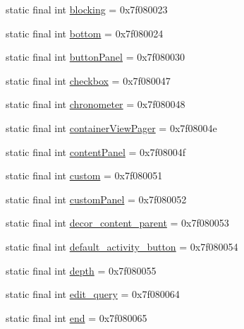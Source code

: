 \begin{DoxyCompactItemize}
static final int \mbox{\hyperlink{classcom_1_1synnapps_1_1carouselview_1_1_r_1_1id_aafcba51137f6801a670d033138ea79bc}{blocking}} = 0x7f080023
\item 
static final int \mbox{\hyperlink{classcom_1_1synnapps_1_1carouselview_1_1_r_1_1id_ade195cb43297c660f4605ecacfd8093a}{bottom}} = 0x7f080024
\item 
static final int \mbox{\hyperlink{classcom_1_1synnapps_1_1carouselview_1_1_r_1_1id_af4950f87776c468460507aab45d9c0c6}{button\+Panel}} = 0x7f080030
\item 
static final int \mbox{\hyperlink{classcom_1_1synnapps_1_1carouselview_1_1_r_1_1id_a3d79a51879e7bcf8c7d735561028c9a3}{checkbox}} = 0x7f080047
\item 
static final int \mbox{\hyperlink{classcom_1_1synnapps_1_1carouselview_1_1_r_1_1id_a3e39f0858d0786baa715662366dd7603}{chronometer}} = 0x7f080048
\item 
static final int \mbox{\hyperlink{classcom_1_1synnapps_1_1carouselview_1_1_r_1_1id_a8a6f1ccee207b944b72dd2493f7a5511}{container\+View\+Pager}} = 0x7f08004e
\item 
static final int \mbox{\hyperlink{classcom_1_1synnapps_1_1carouselview_1_1_r_1_1id_a4e288de3357b62e8b6f8f0326c8ec887}{content\+Panel}} = 0x7f08004f
\item 
static final int \mbox{\hyperlink{classcom_1_1synnapps_1_1carouselview_1_1_r_1_1id_ae318ca05c36b61f80bcb72d130ff644d}{custom}} = 0x7f080051
\item 
static final int \mbox{\hyperlink{classcom_1_1synnapps_1_1carouselview_1_1_r_1_1id_ad071dc506c952f537a8da8155f1601ae}{custom\+Panel}} = 0x7f080052
\item 
static final int \mbox{\hyperlink{classcom_1_1synnapps_1_1carouselview_1_1_r_1_1id_ab5462acd04a2b406cde23f7d31b90077}{decor\+\_\+content\+\_\+parent}} = 0x7f080053
\item 
static final int \mbox{\hyperlink{classcom_1_1synnapps_1_1carouselview_1_1_r_1_1id_a4d6edeee30ec885e12e630932323eebd}{default\+\_\+activity\+\_\+button}} = 0x7f080054
\item 
static final int \mbox{\hyperlink{classcom_1_1synnapps_1_1carouselview_1_1_r_1_1id_a0c43a82e175b4620aaffbd63fcf7c2ea}{depth}} = 0x7f080055
\item 
static final int \mbox{\hyperlink{classcom_1_1synnapps_1_1carouselview_1_1_r_1_1id_aeaed825460b674fed20867dbb8eeb7d7}{edit\+\_\+query}} = 0x7f080064
\item 
static final int \mbox{\hyperlink{classcom_1_1synnapps_1_1carouselview_1_1_r_1_1id_a83644c403d3cb9f245850a3ff236c46b}{end}} = 0x7f080065

\end{DoxyCompactItemize}
